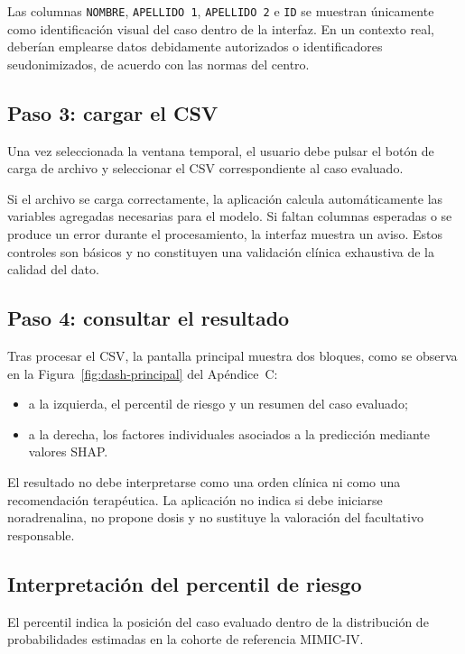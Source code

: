 \documentclass[
  spanish,
  a4paper,
  12pt,
  twoside]{memoir}
\begin{document}
Las columnas \texttt{NOMBRE}, \texttt{APELLIDO 1}, \texttt{APELLIDO 2} e \texttt{ID} se muestran únicamente como identificación visual del caso dentro de la interfaz. En un contexto real, deberían emplearse datos debidamente autorizados o identificadores seudonimizados, de acuerdo con las normas del centro.

\subsection*{Paso 3: cargar el CSV}

Una vez seleccionada la ventana temporal, el usuario debe pulsar el botón de carga de archivo y seleccionar el CSV correspondiente al caso evaluado.

Si el archivo se carga correctamente, la aplicación calcula automáticamente las variables agregadas necesarias para el modelo. Si faltan columnas esperadas o se produce un error durante el procesamiento, la interfaz muestra un aviso. Estos controles son básicos y no constituyen una validación clínica exhaustiva de la calidad del dato.

\subsection*{Paso 4: consultar el resultado}

Tras procesar el CSV, la pantalla principal muestra dos bloques, como se observa en la Figura~\ref{fig:dash-principal} del Apéndice~C:

\begin{itemize}
  \item a la izquierda, el percentil de riesgo y un resumen del caso evaluado;
  \item a la derecha, los factores individuales asociados a la predicción mediante valores SHAP.
\end{itemize}

El resultado no debe interpretarse como una orden clínica ni como una recomendación terapéutica. La aplicación no indica si debe iniciarse noradrenalina, no propone dosis y no sustituye la valoración del facultativo responsable.

\subsection*{Interpretación del percentil de riesgo}

El percentil indica la posición del caso evaluado dentro de la distribución de probabilidades estimadas en la cohorte de referencia MIMIC-IV.
\end{document}
